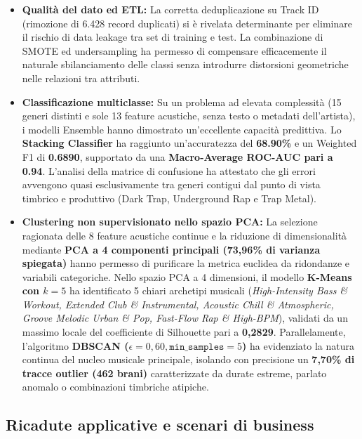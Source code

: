 \begin{itemize}
    \item \textbf{Qualità del dato ed ETL:} La corretta deduplicazione su Track ID (rimozione di 6.428 record duplicati) si è rivelata determinante per eliminare il rischio di data leakage tra set di training e test. La combinazione di SMOTE ed undersampling ha permesso di compensare efficacemente il naturale sbilanciamento delle classi senza introdurre distorsioni geometriche nelle relazioni tra attributi.
    \item \textbf{Classificazione multiclasse:} Su un problema ad elevata complessità (15 generi distinti e sole 13 feature acustiche, senza testo o metadati dell'artista), i modelli Ensemble hanno dimostrato un'eccellente capacità predittiva. Lo \textbf{Stacking Classifier} ha raggiunto un'accuratezza del \textbf{68.90\%} e un Weighted F1 di \textbf{0.6890}, supportato da una \textbf{Macro-Average ROC-AUC pari a 0.94}. L'analisi della matrice di confusione ha attestato che gli errori avvengono quasi esclusivamente tra generi contigui dal punto di vista timbrico e produttivo (Dark Trap, Underground Rap e Trap Metal).
    \item \textbf{Clustering non supervisionato nello spazio PCA:} La selezione ragionata delle 8 feature acustiche continue e la riduzione di dimensionalità mediante \textbf{PCA a 4 componenti principali (73,96\% di varianza spiegata)} hanno permesso di purificare la metrica euclidea da ridondanze e variabili categoriche. Nello spazio PCA a 4 dimensioni, il modello \textbf{K-Means con $k=5$} ha identificato 5 chiari archetipi musicali (\textit{High-Intensity Bass \& Workout, Extended Club \& Instrumental, Acoustic Chill \& Atmospheric, Groove Melodic Urban \& Pop, Fast-Flow Rap \& High-BPM}), validati da un massimo locale del coefficiente di Silhouette pari a \textbf{0,2829}. Parallelamente, l'algoritmo \textbf{DBSCAN ($\epsilon = 0,60, \texttt{min\_samples} = 5$)} ha evidenziato la natura continua del nucleo musicale principale, isolando con precisione un \textbf{7,70\% di tracce outlier (462 brani)} caratterizzate da durate estreme, parlato anomalo o combinazioni timbriche atipiche.
\end{itemize}

\subsection{Ricadute applicative e scenari di business}

